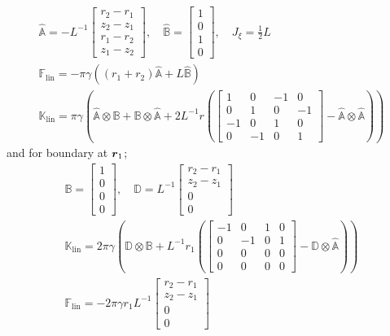 \documentclass[a4paper,11pt]{article}
\renewcommand{\to}[1]{\text{\boldmath $#1$}} %
\newcommand{\uv}[1]{\mathds{#1}}
\newcommand{\um}[1]{\mathds{#1}}
\newcommand{\linear}{\mathrm{lin}}
\begin{document}
\begin{gather}
 \nonumber \hat{\uv A} = -L^{-1}\begin{bmatrix}r_2-r_1\\z_2-z_1\\r_1-r_2\\z_1-z_2\end{bmatrix}, \quad
 \hat{\uv B} = \begin{bmatrix}1\\0\\1\\0\end{bmatrix},\quad J_\xi = \frac12 L\\
 \uv F_\linear = -\pi \gamma \left((r_1+r_2)\hat{\uv A} + L\hat{\uv B}\right)\\
 \um K_\linear = \pi \gamma \left(
  \hat{\uv A}\otimes\uv B + \hat{\uv B}\otimes\hat{\uv A}
  + 2L^{-1} r \left(\begin{bmatrix}1&0&-1&0\\0&1&0&-1\\-1&0&1&0\\0&-1&0&1\end{bmatrix} - \hat{\uv A}\otimes\hat{\uv A}\right)
  \right)
\end{gather}
and for boundary at $\to r_1$;
\begin{gather}
 \nonumber \uv B = \begin{bmatrix}1\\0\\0\\0\end{bmatrix}, \quad \uv D = L^{-1}\begin{bmatrix}r_2-r_1\\z_2-z_1\\0\\0\end{bmatrix}\\
 \uv K_\linear = 2\pi \gamma\left(\uv D\otimes \uv B + L^{-1} r_1 \left(\begin{bmatrix}-1&0&1&0\\0&-1&0&1\\0&0&0&0\\0&0&0&0\end{bmatrix}- \uv D\otimes \hat{\uv A}\right)\right)\\
 \uv F_\linear = -2\pi \gamma r_1 L^{-1} \begin{bmatrix}r_2-r_1\\z_2-z_1\\0\\0\end{bmatrix}
\end{gather}
\end{document}
